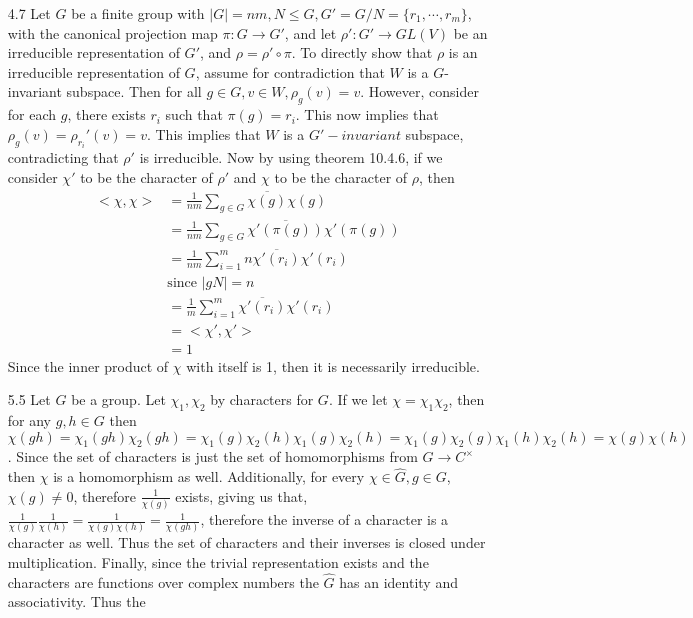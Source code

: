 \documentclass[12pt, letterpaper]{article}
\begin{document}
\begin{enumerate}
\begin{enumerate}
	\end{enumerate}
	\item[4.7] Let $G$ be a finite group with $|G| = nm, N \leq G, G' = G / N = \{r_1,\cdots,r_m\}$, with the canonical projection map $\pi : G \to G'$, 
	and let $\rho': G' \to GL(V)$ be an irreducible representation of $G'$, and $\rho = \rho' \circ \pi$.  To directly 
	show that $\rho$ is an irreducible representation of $G$, assume for contradiction that $W$ is a $G$-invariant
	subspace.  Then for all $g \in G, v \in W, \rho_g(v) = v$.  However, consider for each $g$, there exists $r_i$ 
	such that $\pi(g) = r_i$.  This now implies that $\rho_g(v) = \rho_{r_i}'(v) = v$.  This implies that 
	$W$ is a $G'-invariant$ subspace, contradicting that $\rho'$ is irreducible.  Now by using theorem 10.4.6, 
	if we consider $\chi'$ to be the character of $\rho'$ and $\chi$ to be the character of $\rho$, then 
	\begin{align*}
	<\chi,\chi> &= \frac{1}{nm} \sum_{g \in G} \overline{\chi(g)}\chi(g)\\
	&= \frac{1}{nm} \sum_{g \in G} \overline{\chi'(\pi(g))}\chi'(\pi(g))\\
	&= \frac{1}{nm} \sum_{i=1}^m n \overline{\chi'(r_i)}\chi'(r_i)\\
	& \text{since } |gN| = n\\
	&= \frac{1}{m}\sum_{i=1}^m \overline{\chi'(r_i)}\chi'(r_i)\\ 
	&= <\chi',\chi'> \\
	&= 1
	\end{align*}
	Since the inner product of $\chi$ with itself is 1, then it is necessarily irreducible.  
	\item[5.5] Let $G$ be a group.  Let $\chi_1, \chi_2$ by characters for 
	$G$.  If we let $\chi = \chi_1 \chi_2$, then for any $g,h \in G$ then $\chi(gh) = \chi_1(gh)\chi_2(gh) = 
	\chi_1(g)\chi_2(h)\chi_1(g)\chi_2(h) = \chi_1(g)\chi_2(g)\chi_1(h)\chi_2(h) = \chi(g)\chi(h)$.  Since the 
	set of characters is just the set of homomorphisms from $G \to C^{\times}$ then $\chi$ is a homomorphism as well. 
	Additionally, for every $\chi \in \hat{G}, g \in G$, $\chi(g) \neq 0$, therefore 
	$\frac{1}{\chi(g)}$ exists, giving us that, $\frac{1}{\chi(g)}\frac{1}{\chi(h)} = \frac{1}{\chi(g)\chi(h)} = \frac{1}{\chi(gh)}$, therefore
	the inverse of a character is a character as well.  Thus the set of characters and their 
	inverses is closed under 
	multiplication.  Finally, since the trivial representation exists and the characters are functions over complex numbers the $\hat{G}$ has an identity and associativity.  Thus the 

\end{enumerate}
\end{document}
